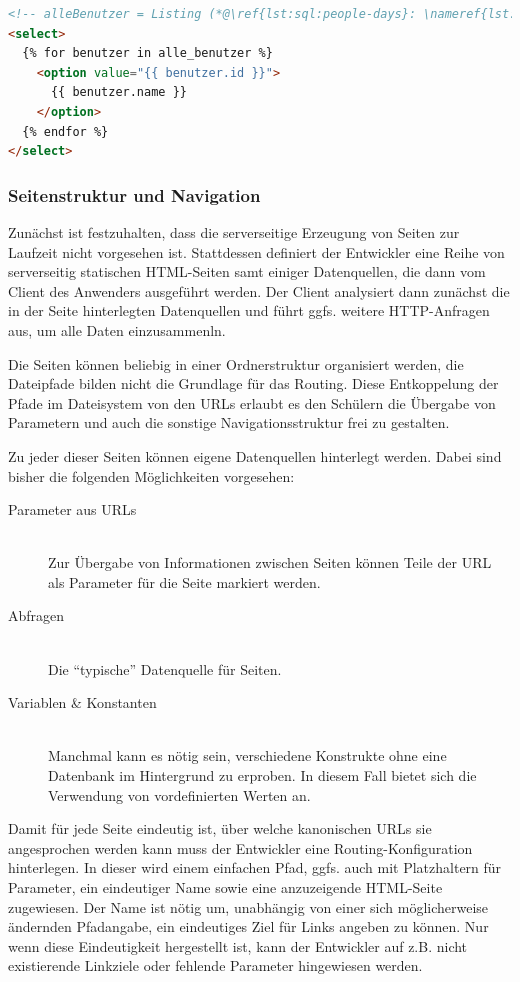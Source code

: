\begin{lstlisting}[language=HTML, caption=Containerelemente mit Kindern, label=lst:html:select-example]
<!-- alleBenutzer = Listing (*@\ref{lst:sql:people-days}: \nameref{lst:sql:people-days}@*) -->
<select>
  {% for benutzer in alle_benutzer %}
    <option value="{{ benutzer.id }}">
      {{ benutzer.name }}
    </option>
  {% endfor %}
</select>
\end{lstlisting}

\subsubsection{Seitenstruktur und Navigation}

Zunächst ist festzuhalten, dass die serverseitige Erzeugung von Seiten zur Laufzeit nicht vorgesehen ist. Stattdessen definiert der Entwickler eine Reihe von serverseitig statischen HTML-Seiten samt einiger Datenquellen, die dann vom Client des Anwenders ausgeführt werden. Der Client analysiert dann zunächst die in der Seite hinterlegten Datenquellen und führt ggfs. weitere HTTP-Anfragen aus, um alle Daten einzusammenln.

Die Seiten können beliebig in einer Ordnerstruktur organisiert werden, die Dateipfade bilden nicht die Grundlage für das Routing. Diese Entkoppelung der Pfade im Dateisystem von den URLs erlaubt es den Schülern die Übergabe von Parametern und auch die sonstige Navigationsstruktur frei zu gestalten.

Zu jeder dieser Seiten können eigene Datenquellen hinterlegt werden. Dabei sind bisher die folgenden Möglichkeiten vorgesehen:

\begin{description}
  \item[Parameter aus URLs] \hfill \\
    Zur Übergabe von Informationen zwischen Seiten können Teile der URL als Parameter für die Seite markiert werden.
  \item[Abfragen] \hfill \\
    Die ``typische'' Datenquelle für Seiten.
  \item[Variablen \& Konstanten] \hfill \\
    Manchmal kann es nötig sein, verschiedene Konstrukte ohne eine Datenbank im Hintergrund zu erproben. In diesem Fall bietet sich die Verwendung von vordefinierten Werten an.
\end{description}

Damit für jede Seite eindeutig ist, über welche kanonischen URLs sie angesprochen werden kann muss der Entwickler eine Routing-Konfiguration hinterlegen. In dieser wird einem einfachen Pfad, ggfs. auch mit Platzhaltern für Parameter, ein eindeutiger Name sowie eine anzuzeigende HTML-Seite zugewiesen. Der Name ist nötig um, unabhängig von einer sich möglicherweise ändernden Pfadangabe, ein eindeutiges Ziel für Links angeben zu können. Nur wenn diese Eindeutigkeit hergestellt ist, kann der Entwickler auf z.B. nicht existierende Linkziele oder fehlende Parameter hingewiesen werden.

